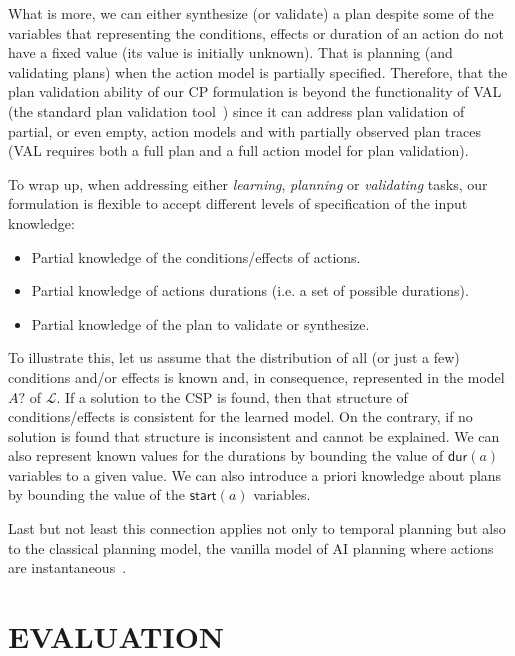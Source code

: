 \documentclass{ecai}
\newcommand{\dur}{\mathsf{dur}}    %
\newcommand{\start}{\mathsf{start}}%
\begin{document}
What is more, we can either synthesize (or validate) a plan despite some of the variables that representing the conditions, effects or duration of an action do not have a fixed value (its value is initially unknown). That is planning (and validating plans) when the action model is partially specified. Therefore, that the plan validation ability of our CP formulation is beyond the functionality of VAL (the standard plan validation tool~\cite{howey2004val}) since it can address plan validation of partial, or even empty, action models and with partially observed plan traces (VAL requires both a full plan and a full action model for plan validation).

To wrap up, when addressing either {\em learning}, {\em planning} or {\em validating} tasks, our formulation is flexible to accept different levels of specification of the input knowledge:

\begin{itemize}
\item Partial knowledge of the conditions/effects of actions.
\item Partial knowledge of actions durations (i.e. a set of possible durations).
\item Partial knowledge of the plan to validate or synthesize.
\end{itemize}

To illustrate this, let us assume that the distribution of all (or just a few) conditions and/or effects is known and, in consequence, represented in the model $A?$ of $\mathcal{L}$. If a solution to the CSP is found, then that structure of conditions/effects is consistent for the learned model. On the contrary, if no solution is found that structure is inconsistent and cannot be explained. We can also represent known values for the durations by bounding the value of $\dur(a)$ variables to a given value. We can also introduce a priori knowledge about plans by bounding the value of the $\start(a)$ variables.

Last but not least this connection applies not only to temporal planning but also to the classical planning model, the vanilla model of AI planning where actions are instantaneous~\cite{geffner2013concise}. 





  
\section{EVALUATION}
\label{sec:evaluation}
\end{document}
